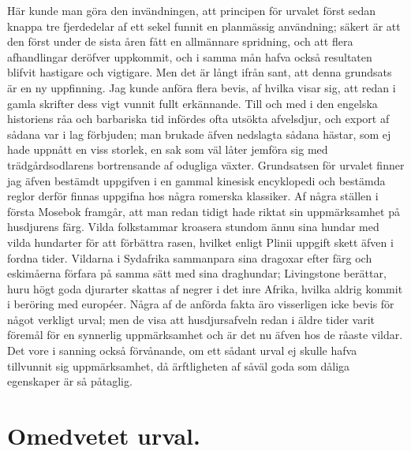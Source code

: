 Här kunde man göra den invändningen, att principen för urvalet först sedan knappa tre fjerdedelar af ett sekel funnit en planmässig användning; säkert är att den först under de sista åren fått en allmännare spridning, och att flera afhandlingar deröfver uppkommit, och i samma mån hafva också resultaten blifvit hastigare och vigtigare. Men det är långt ifrån sant, att denna grundsats är en ny uppfinning. Jag kunde anföra flera bevis, af hvilka visar sig, att redan i gamla skrifter dess vigt vunnit fullt erkännande. Till och med i den engelska historiens råa och barbariska tid infördes ofta utsökta afvelsdjur, och export af sådana var i lag förbjuden; man brukade äfven nedslagta sådana hästar, som ej hade uppnått en viss storlek, en sak som väl låter jemföra sig med trädgårdsodlarens bortrensande af odugliga växter. Grundsatsen för urvalet finner jag äfven bestämdt uppgifven i en gammal kinesisk encyklopedi och bestämda reglor derför finnas uppgifna hos några romerska klassiker. Af några ställen i första Mosebok framgår, att man redan tidigt hade riktat sin uppmärksamhet på husdjurens färg. Vilda folkstammar kroasera stundom ännu sina hundar med vilda hundarter för att förbättra rasen, hvilket enligt Plinii uppgift skett äfven i fordna tider. Vildarna i Sydafrika sammanpara sina dragoxar efter färg och eskimåerna förfara på samma sätt med sina draghundar; Livingstone berättar, huru högt goda djurarter skattas af negrer i det inre Afrika, hvilka aldrig kommit i beröring med européer. Några af de anförda fakta äro visserligen icke bevis för något verkligt urval; men de visa att husdjursafveln redan i äldre tider varit föremål för en synnerlig uppmärksamhet och är det nu äfven hos de råaste vildar. Det vore i sanning också förvånande, om ett sådant urval ej skulle hafva tillvunnit sig uppmärksamhet, då ärftligheten af såväl goda som dåliga egenskaper är så påtaglig.



\section{Omedvetet urval.}

